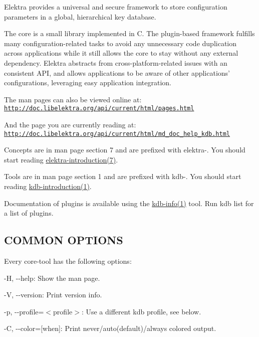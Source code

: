 Elektra provides a universal and secure framework to store configuration parameters in a global, hierarchical key database.

The core is a small library implemented in C. The plugin-\/based framework fulfills many configuration-\/related tasks to avoid any unnecessary code duplication across applications while it still allows the core to stay without any external dependency. Elektra abstracts from cross-\/platform-\/related issues with an consistent A\+P\+I, and allows applications to be aware of other applications' configurations, leveraging easy application integration.

The man pages can also be viewed online at\+: \href{http://doc.libelektra.org/api/current/html/pages.html}{\tt http\+://doc.\+libelektra.\+org/api/current/html/pages.\+html}

And the page you are currently reading at\+: \href{http://doc.libelektra.org/api/current/html/md_doc_help_kdb.html}{\tt http\+://doc.\+libelektra.\+org/api/current/html/md\+\_\+doc\+\_\+help\+\_\+kdb.\+html}

Concepts are in man page section 7 and are prefixed with {\ttfamily elektra-\/}. You should start reading \hyperlink{md_doc_help_elektra-introduction_doc_help_elektra-introduction_md}{elektra-\/introduction(7)}.

Tools are in man page section 1 and are prefixed with {\ttfamily kdb-\/}. You should start reading \hyperlink{doc_help_kdb-introduction_md}{kdb-\/introduction(1)}.

Documentation of plugins is available using the \hyperlink{md_doc_help_kdb-info_doc_help_kdb-info_md}{kdb-\/info(1)} tool. Run {\ttfamily kdb list} for a list of plugins.

\subsection*{C\+O\+M\+M\+O\+N O\+P\+T\+I\+O\+N\+S}

Every core-\/tool has the following options\+:


\begin{DoxyItemize}
\item {\ttfamily -\/\+H}, {\ttfamily -\/-\/help}\+: Show the man page.
\item {\ttfamily -\/\+V}, {\ttfamily -\/-\/version}\+: Print version info.
\item {\ttfamily -\/p}, {\ttfamily -\/-\/profile}=$<$profile$>$\+: Use a different kdb profile, see below.
\item {\ttfamily -\/\+C}, {\ttfamily -\/-\/color}=\mbox{[}when\mbox{]}\+: Print never/auto(default)/always colored output.
\end{DoxyItemize}

